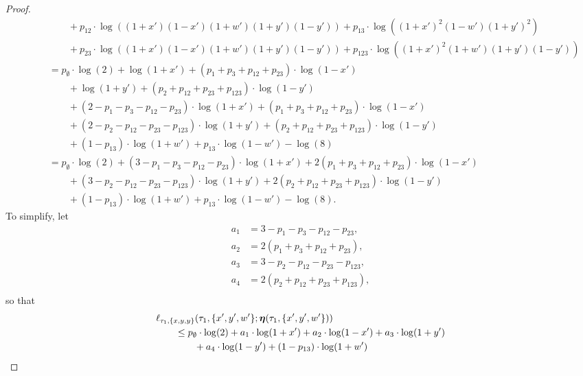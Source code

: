 \begin{proof}
\begin{align*}
    &\qquad\qquad + p_{12}         \cdot\log((1+x')(1-x')(1+w')(1+y')(1-y'))
+ p_{13}         \cdot\log((1+x')^2   (1-w')(1+y')^2) \\
    &\qquad\qquad + p_{23}         \cdot\log((1+x')(1-x')(1+w')(1+y')(1-y'))
+ p_{123}        \cdot\log((1+x')^2   (1+w')(1+y')(1-y')) \\
&\qquad =      p_{\emptyset}  \cdot\log(2)
+ \log(1+x')
+ (p_{1}+p_{3}+p_{12}+p_{23})\cdot\log(1-x') \\
&\qquad\qquad + \log(1+y')
+ (p_{2}+p_{12}+p_{23}+p_{123})\cdot\log(1-y') \\
&\qquad\qquad + (2-p_{1}-p_{3}-p_{12}-p_{23})\cdot\log(1+x')
+ (p_{1}+p_{3}+p_{12}+p_{23})\cdot\log(1-x') \\
&\qquad\qquad + (2-p_{2}-p_{12}-p_{23}-p_{123})\cdot\log(1+y')
+ (p_{2}+p_{12}+p_{23}+p_{123})\cdot\log(1-y') \\
&\qquad\qquad + (1-p_{13})\cdot\log(1+w')
+ p_{13}\cdot\log(1-w')
- \log(8) \\
&\qquad =      p_{\emptyset}  \cdot\log(2)
+ (3-p_{1}-p_{3}-p_{12}-p_{23})\cdot\log(1+x')
+ 2(p_{1}+p_{3}+p_{12}+p_{23})\cdot\log(1-x') \\
&\qquad\qquad + (3-p_{2}-p_{12}-p_{23}-p_{123})\cdot\log(1+y')
+ 2(p_{2}+p_{12}+p_{23}+p_{123})\cdot\log(1-y') \\
&\qquad\qquad + (1-p_{13})\cdot\log(1+w')
+ p_{13}\cdot\log(1-w')
- \log(8).
\end{align*}
To simplify, let
\begin{equation}
    \begin{aligned}
        a_{1} &= 3-p_{1}-p_{3}-p_{12}-p_{23}, \\
        a_{2} &= 2(p_{1}+p_{3}+p_{12}+p_{23}), \\
        a_{3} &= 3-p_{2}-p_{12}-p_{23}-p_{123}, \\
        a_{4} &= 2(p_{2}+p_{12}+p_{23}+p_{123}), \\
    \end{aligned}
    \label{eq:a_const}
\end{equation}
so that
\begin{equation*}
\begin{split}
&    \ell_{\tau_1,\{x,y,y\}}(\tau_1, \{x',y',w'\}; \fullAncestralSplitPartitions(\tau_1,\{x',y',w'\})) \\
&\qquad \le      p_{\emptyset}  \cdot\log(2)
+ a_{1}\cdot\log(1+x')
+ a_{2}\cdot\log(1-x')
+ a_{3}\cdot\log(1+y') \\
&\qquad\qquad + a_{4}\cdot\log(1-y')
+ (1-p_{13})\cdot\log(1+w')

\end{split}
\end{equation*}
\end{proof}
